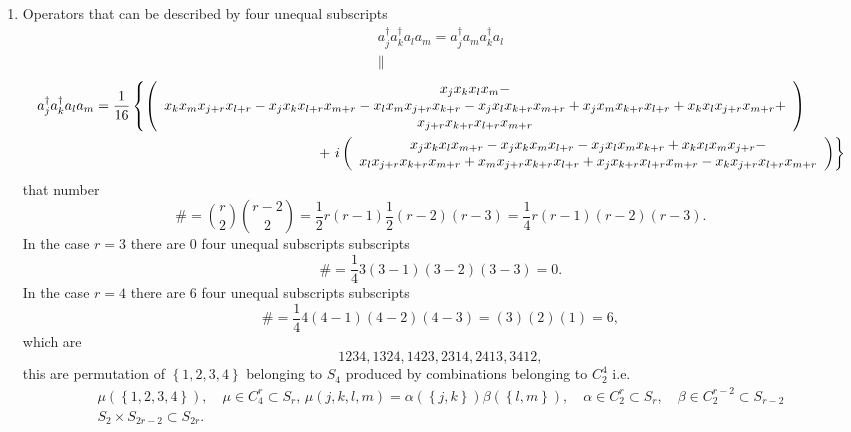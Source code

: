 \documentclass[aps,preprint]{revtex4}%
\begin{document}
\begin{enumerate}
\item Operators that can be described by four unequal subscripts%
\begin{gather}
a_{j}^{\dagger}a_{k}^{\dagger}a_{l}a_{m}=a_{j}^{\dagger}a_{m}a_{k}^{\dagger
}a_{l}\\
\parallel
\end{gather}%
\begin{align}
&  a_{j}^{\dagger}a_{k}^{\dagger}a_{l}a_{m}=\frac{1}{16}\left\{  \left(
\begin{array}
[c]{c}%
x_{j}x_{k}x_{l}x_{m}-\\
x_{k}x_{m}x_{j+r}x_{l+r}-x_{j}x_{k}x_{l+r}x_{m+r}-x_{l}x_{m}x_{j+r}%
x_{k+r}-x_{j}x_{l}x_{k+r}x_{m+r}+x_{j}x_{m}x_{k+r}x_{l+r}+x_{k}x_{l}%
x_{j+r}x_{m+r}+\\
x_{j+r}x_{k+r}x_{l+r}x_{m+r}%
\end{array}
\right)  \right.  \\
&  \qquad\qquad\qquad\qquad\qquad\qquad\qquad\qquad\qquad\qquad+\left.
i\left(
\begin{array}
[c]{c}%
x_{j}x_{k}x_{l}x_{m+r}-x_{j}x_{k}x_{m}x_{l+r}-x_{j}x_{l}x_{m}x_{k+r}%
+x_{k}x_{l}x_{m}x_{j+r}-\\
x_{l}x_{j+r}x_{k+r}x_{m+r}+x_{m}x_{j+r}x_{k+r}x_{l+r}+x_{j}x_{k+r}%
x_{l+r}x_{m+r}-x_{k}x_{j+r}x_{l+r}x_{m+r}%
\end{array}
\right)  \right\}
\end{align}
that number
\begin{equation}
\#=\binom{r}{2}\binom{r-2}{2}=\frac{1}{2}r\left(  r-1\right)  \frac{1}%
{2}\left(  r-2\right)  \left(  r-3\right)  =\frac{1}{4}r\left(  r-1\right)
\left(  r-2\right)  \left(  r-3\right)  .
\end{equation}
In the case $r=3$ there are $0$  four unequal subscripts subscripts
\begin{equation}
\#=\frac{1}{4}3\left(  3-1\right)  \left(  3-2\right)  \left(  3-3\right)  =0.
\end{equation}
In the case $r=4$ there are $6$  four unequal subscripts subscripts
\begin{equation}
\#=\frac{1}{4}4\left(  4-1\right)  \left(  4-2\right)  \left(  4-3\right)
=\left(  3\right)  \left(  2\right)  \left(  1\right)  =6,
\end{equation}
which are
\[
1234,1324,1423,2314,2413,3412,
\]
this are permutation of $\left\{  1,2,3,4\right\}  $ belonging to $S_{4}$
produced by combinations belonging to $C_{2}^{4}$ i.e.
\begin{gather}
\mu\left(  \left\{  1,2,3,4\right\}  \right)  ,\quad\mu\in C_{4}^{r}\subset
S_{r},\,\mu\left(  j,k,l,m\right)  =\alpha\left(  \left\{  j,k\right\}
\right)  \beta\left(  \left\{  l,m\right\}  \right)  ,\quad\alpha\in C_{2}%
^{r}\subset S_{r},\quad\beta\in C_{2}^{r-2}\subset S_{r-2}\\
S_{2}\times S_{2r-2}\subset S_{2r}.
\end{gather}

\end{enumerate}
\end{document}
